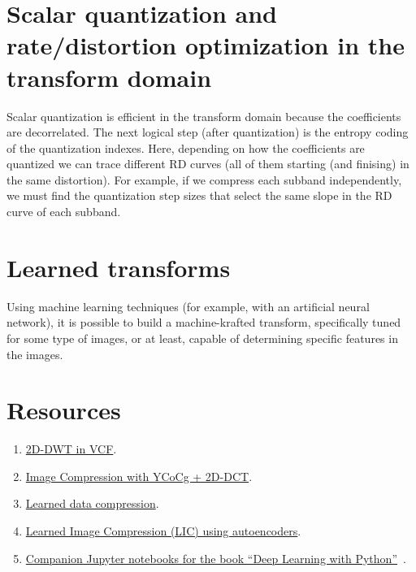 
\section{Scalar quantization and rate/distortion optimization in the transform domain}

Scalar quantization is efficient in the transform domain because the
coefficients are decorrelated. The next logical step (after
quantization) is the entropy coding of the quantization indexes. Here,
depending on how the coefficients are quantized we can trace different
RD curves (all of them starting (and finising) in the same
distortion). For example, if we compress each subband independently,
we must find the quantization step sizes that select the same slope in
the RD curve of each subband.


\section{Learned transforms}

Using machine learning techniques (for example, with an artificial
neural network), it is possible to build a machine-krafted transform,
specifically tuned for some type of images, or at least, capable of
determining specific features in the images.


\section{Resources}

\begin{enumerate}
\item \href{https://github.com/Sistemas-Multimedia/VCF/blob/main/src/DWT2D.py}{2D-DWT in VCF}.
\item
  \href{https://github.com/vicente-gonzalez-ruiz/DCT/blob/master/docs/YCoCg_2D_DCT_SQ.ipynb}{Image
    Compression with YCoCg + 2D-DCT}.
\item
  \href{https://www.tensorflow.org/tutorials/generative/data_compression}{Learned
    data compression}.
\item
  \href{https://github.com/vicente-gonzalez-ruiz/learned_image_compression/blob/main/LIC.ipynb}{Learned
    Image Compression (LIC) using autoencoders}.
\item
  \href{https://github.com/fchollet/deep-learning-with-python-notebooks}{Companion
    Jupyter notebooks for the book ``Deep Learning with
    Python''}~\cite{chollet2021deep}.
\end{enumerate}

